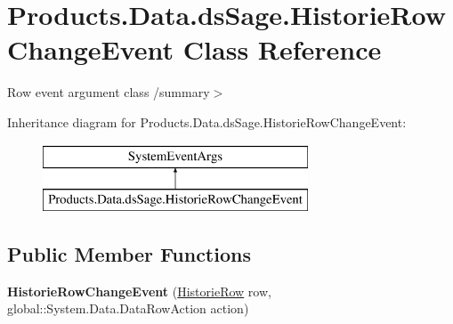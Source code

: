 \hypertarget{class_products_1_1_data_1_1ds_sage_1_1_historie_row_change_event}{}\section{Products.\+Data.\+ds\+Sage.\+Historie\+Row\+Change\+Event Class Reference}
\label{class_products_1_1_data_1_1ds_sage_1_1_historie_row_change_event}


Row event argument class /summary$>$  


Inheritance diagram for Products.\+Data.\+ds\+Sage.\+Historie\+Row\+Change\+Event\+:\begin{figure}[H]
\begin{center}
\leavevmode
\includegraphics[height=2.000000cm]{class_products_1_1_data_1_1ds_sage_1_1_historie_row_change_event}
\end{center}
\end{figure}
\subsection*{Public Member Functions}
\begin{DoxyCompactItemize}
\item 
{\bfseries Historie\+Row\+Change\+Event} (\hyperlink{class_products_1_1_data_1_1ds_sage_1_1_historie_row}{Historie\+Row} row, global\+::\+System.\+Data.\+Data\+Row\+Action action)\hypertarget{class_products_1_1_data_1_1ds_sage_1_1_historie_row_change_event_abd4d4bff76068a0bbcced6dca29987fb}{}\label{class_products_1_1_data_1_1ds_sage_1_1_historie_row_change_event_abd4d4bff76068a0bbcced6dca29987fb}

\end{DoxyCompactItemize}
